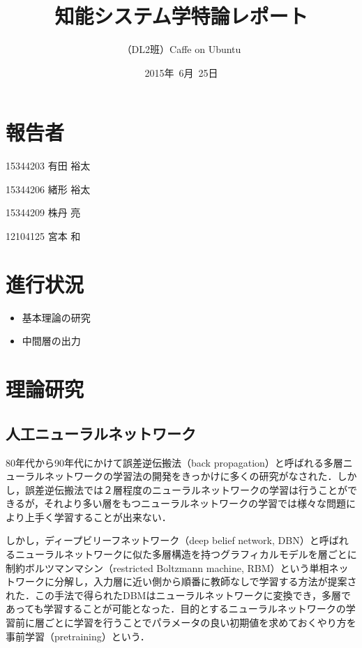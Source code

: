 \documentclass[a4paper,10pt]{jsarticle}
\title{知能システム学特論レポート}
\author{
（DL2班）Caffe on Ubuntu\\
}
\date{2015年\ 6月\ 25日}
\begin{document}
\maketitle
\section{報告者}
\begin{list}{}{}
 \item 15344203\hspace{0.5cm} 有田 裕太
 \item 15344206\hspace{0.5cm} 緒形 裕太
 \item 15344209\hspace{0.5cm} 株丹 亮
 \item 12104125\hspace{0.5cm} 宮本 和
\end{list}

\section{進行状況}
\begin{itemize}
\item 基本理論の研究
\item 中間層の出力
\end{itemize}

\section{理論研究}

\subsection{人工ニューラルネットワーク}
80年代から90年代にかけて誤差逆伝搬法（back propagation）と呼ばれる多層ニューラルネットワークの学習法の開発をきっかけに多くの研究がなされた．しかし，誤差逆伝搬法では２層程度のニューラルネットワークの学習は行うことができるが，それより多い層をもつニューラルネットワークの学習では様々な問題により上手く学習することが出来ない．

しかし，ディープビリーフネットワーク（deep belief network, DBN）と呼ばれるニューラルネットワークに似た多層構造を持つグラフィカルモデルを層ごとに制約ボルツマンマシン（restricted Boltzmann machine, RBM）という単相ネットワークに分解し，入力層に近い側から順番に教師なしで学習する方法が提案された．この手法で得られたDBMはニューラルネットワークに変換でき，多層であっても学習することが可能となった．目的とするニューラルネットワークの学習前に層ごとに学習を行うことでパラメータの良い初期値を求めておくやり方を事前学習（pretraining）という．
\end{document}
